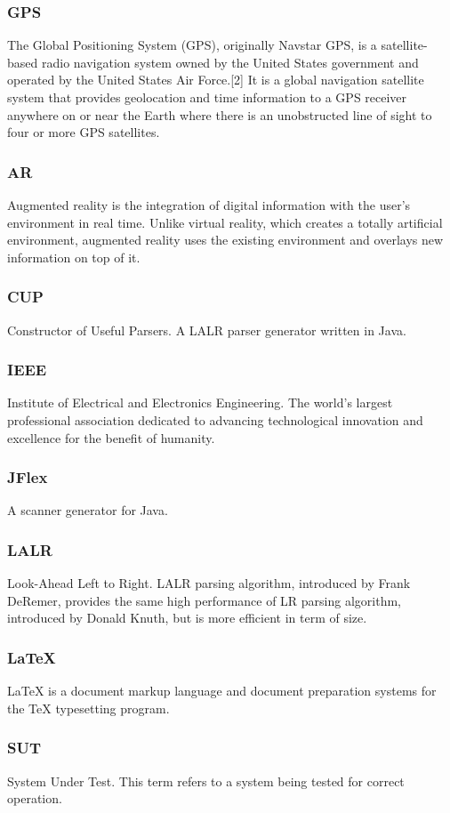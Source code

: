 \subsubsection*{GPS}

The Global Positioning System (GPS), originally Navstar GPS, is a satellite-based radio navigation system owned by the United States government and operated by the United States Air Force.[2] It is a global navigation satellite system that provides geolocation and time information to a GPS receiver anywhere on or near the Earth where there is an unobstructed line of sight to four or more GPS satellites.

\subsubsection*{AR}

Augmented reality is the integration of digital information with the user's environment in real time. Unlike virtual reality, which creates a totally artificial environment, augmented reality uses the existing environment and overlays new information on top of it.

\subsubsection*{CUP}

Constructor of Useful Parsers. A LALR parser generator written in Java.

\subsubsection*{IEEE}

Institute of Electrical and Electronics Engineering. The world's largest professional association dedicated to advancing technological innovation and excellence for the benefit of humanity.

\subsubsection*{JFlex}

A scanner generator for Java.

\subsubsection*{LALR}

Look-Ahead Left to Right. LALR parsing algorithm, introduced by Frank DeRemer, provides the same high performance of LR parsing algorithm, introduced by Donald Knuth, but is more efficient in term of size.

\subsubsection*{LaTeX}

LaTeX is a document markup language and document preparation systems for the TeX typesetting program.

\subsubsection*{SUT}

System Under Test. This term refers to a system being tested for correct operation.

